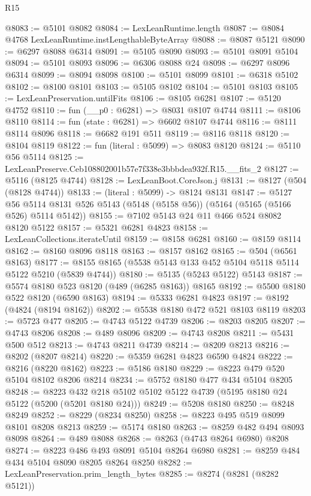 \begin{lexlean}{R15}
\begin{coremodule}
{{{{{{{{{{{@8083 := @5101 @8082
@8084 := LexLeanRuntime.length
@8087 := @8084 @4768 LexLeanRuntime.instLengthableByteArray
@8088 := @8087 @5121
@8090 := @6297 @8088 @6314
@8091 := @5105 @8090
@8093 := @5101 @8091 @5104
@8094 := @5101 @8093
@8096 := @6306 @8088 @24
@8098 := @6297 @8096 @6314
@8099 := @8094 @8098
@8100 := @5101 @8099
@8101 := @6318 @5102
@8102 := @8100 @8101
@8103 := @5105 @8102
@8104 := @5101 @8103
@8105 := LexLeanPreservation.untilFits
@8106 := @8105 @6281
@8107 := @5120 @4752
@8110 := fun (__p0 : @6281) => @8031 @8107 @4744
@8111 := @8106 @8110
@8114 := fun (state : @6281) => @6602 @8107 @4744
@8116 := @8111 @8114 @8096
@8118 := @6682 @191 @511
@8119 := @8116 @8118
@8120 := @8104 @8119
@8122 := fun (literal : @5099) => @8083 @8120
@8124 := @5110 @56 @5114
@8125 := LexLeanPreserve.Ceb108802001b57e7f338e3bbbdea932f.R15.__fits_2
@8127 := @5116 (@8125 @4744)
@8128 := LexLeanBoot.CoreJson.j
@8131 := @8127 (@504 (@8128 @4744))
@8133 := (literal : @5099) -> @8124 @8131
@8147 := @5127
    @56
    @5114
    @8131
    @526
    @5143
    (@5148 (@5158 @56))
    (@5164 (@5165 (@5166 @526) @5114 @5142))
@8155 := @7102 @5143 @24 @11 @466 @524 @8082 @8120 @5122
@8157 := @5321 @6281 @4823
@8158 := LexLeanCollections.iterateUntil
@8159 := @8158 @6281
@8160 := @8159 @8114
@8162 := @8160 @8096 @8118
@8163 := @8157 @8162
@8165 := @504 (@6561 @8163)
@8177 := @8155 @8165 (@5538 @5143 @133 @452 @5104 @5118 @5114 @5122 @5210 (@5839 @4744))
@8180 := @5135 (@5243 @5122) @5143
@8187 := @5574 @8180 @523 @8120 (@489 (@6285 @8163)) @8165
@8192 := @5500 @8180 @522 @8120 (@6590 @8163)
@8194 := @5333 @6281 @4823
@8197 := @8192 (@4824 (@8194 @8162))
@8202 := @5538 @8180 @472 @521 @8103 @8119
@8203 := @5723 @477
@8205 := @4743 @5122 @4739
@8206 := @8203 @8205
@8207 := @4743 @8206
@8208 := @489 @8096
@8209 := @4743 @8208
@8211 := @5431 @500 @512
@8213 := @4743 @8211 @4739
@8214 := @8209 @8213
@8216 := @8202 (@8207 @8214)
@8220 := @5359 @6281 @4823 @6590 @4824
@8222 := @8216 (@8220 @8162)
@8223 := @5186 @8180
@8229 := @8223 @479 @520 @5104 @8102 @8206 @8214
@8234 := @5752 @8180 @477 @434 @5104 @8205
@8248 := @8223 @432 @218 @5102 @5102 @5122 @4739 (@5195 @8180 @24 @5122 (@5200 (@5201 @8180 @24)))
@8249 := @5208 @8180
@8250 := @8248 @8249
@8252 := @8229 (@8234 @8250)
@8258 := @8223 @495 @519 @8099 @8101 @8208 @8213
@8259 := @5174 @8180
@8263 := @8259 @482 @494 @8093 @8098
@8264 := @489 @8088
@8268 := @8263 (@4743 @8264 @6980) @8208
@8274 := @8223 @486 @493 @8091 @5104 @8264 @6980
@8281 := @8259 @484 @434 @5104 @8090 @8205 @8264 @8250
@8282 := LexLeanPreservation.prim_length_bytes
@8285 := @8274 (@8281 (@8282 @5121))
}}}}}}}}}}}
\end{coremodule}
\end{lexlean}
